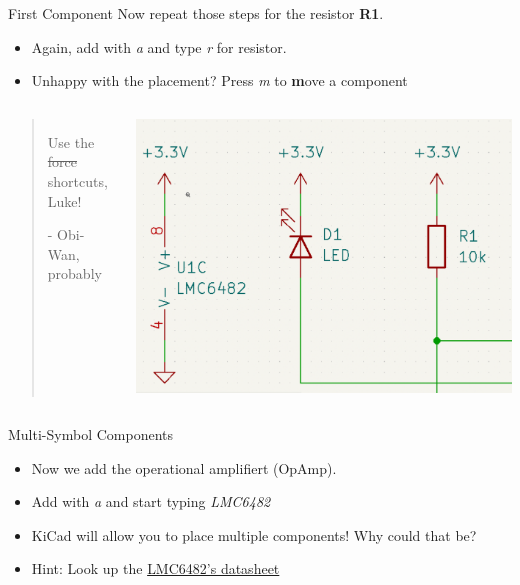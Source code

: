 \documentclass{beamer}
\begin{document}
\begin{frame}{First Component}
  Now repeat those steps for the resistor \textbf{R1}.

  \begin{itemize}
    \item Again, add with \textit{a} and type \textit{r} for resistor.
    \item Unhappy with the placement? Press \textit{m} to \textbf{m}ove a component
  \end{itemize}

  \vfill
  \begin{columns}
    \begin{quote}
      Use the \sout{force} shortcuts, Luke!

    {\normalfont \scriptsize - Obi-Wan, probably}
    \end{quote}
    \includegraphics[width=\textwidth]{images/first-steps.png}
  \end{columns}
\end{frame}

\begin{frame}{Multi-Symbol Components}
  \begin{itemize}
    \item Now we add the operational amplifiert (OpAmp).
    \item Add with \textit{a} and start typing \textit{LMC6482}
    \item KiCad will allow you to place multiple components! Why could that be?
    \item Hint: Look up the \href{http://www.ti.com/lit/ds/symlink/lmc6482.pdf}{LMC6482's datasheet}
  \end{itemize}
\end{frame}
\end{document}
